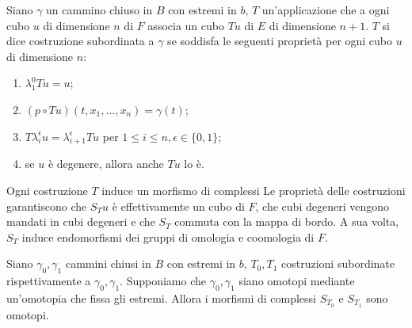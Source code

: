 \begin{definition}
Siano $\gamma$ un cammino chiuso in $B$ con estremi in $b$, $T$ un'applicazione che a ogni cubo $u$ di dimensione $n$ di $F$ associa un cubo $Tu$ di $E$ di dimensione $n+1$. $T$ si dice costruzione subordinata a $\gamma$ se soddisfa le seguenti proprietà per ogni cubo $u$ di dimensione $n$:
\begin{enumerate}
\item $\lambda^0_1 Tu=u$;
\item $(p\circ Tu)(t,x_1,\ldots,x_n)=\gamma(t)$;
\item $T\lambda^\epsilon_iu=\lambda^\epsilon_{i+1}Tu$ per $1\le i\le n,\epsilon\in\{0,1\}$;
\item se $u$ è degenere, allora anche $Tu$ lo è.
\end{enumerate}
\end{definition}
Ogni costruzione $T$ induce un morfismo di complessi
Le proprietà delle costruzioni garantiscono che $S_Tu$ è effettivamente un cubo di $F$, che cubi degeneri vengono mandati in cubi degeneri e che $S_T$ commuta con la mappa di bordo. A sua volta, $S_T$ induce endomorfismi dei gruppi di omologia e coomologia di $F$.
\begin{proposition}
Siano $\gamma_0,\gamma_1$ cammini chiusi in $B$ con estremi in $b$, $T_0,T_1$ costruzioni subordinate rispettivamente a $\gamma_0,\gamma_1$. Supponiamo che $\gamma_0,\gamma_1$ siano omotopi mediante un'omotopia che fissa gli estremi. Allora i morfismi di complessi $S_{T_0}$ e $S_{T_1}$ sono omotopi.
\end{proposition}
